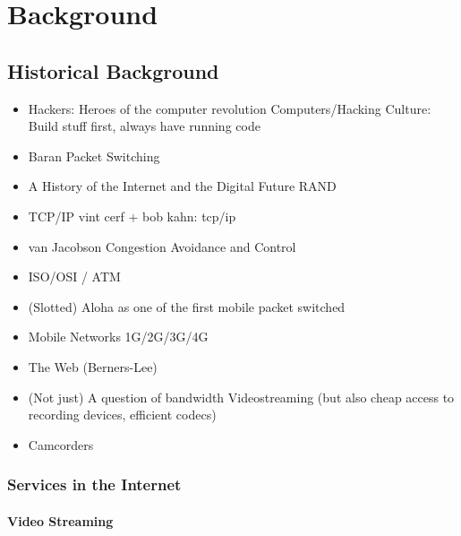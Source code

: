 \chapter{Background}
\label{chap:relatedwork}


\section{Historical Background}

\begin{itemize}
\item Hackers: Heroes of the computer revolution \cite{levy2010hackers}
		Computers/Hacking Culture: Build stuff first, always have running code
\item Baran Packet Switching
\item A History of the Internet and the Digital Future \cite{ryan2010history}
		RAND
\item TCP/IP vint cerf + bob kahn: tcp/ip \cite{1092259}
\item van Jacobson Congestion Avoidance and Control \cite{jacobson1988congestion}
\item ISO/OSI / ATM
\item (Slotted) Aloha as one of the first mobile packet switched
\item Mobile Networks 1G/2G/3G/4G
\item The Web (Berners-Lee)
\item (Not just) A question of bandwidth Videostreaming (but also cheap access to recording devices, efficient codecs)
\item Camcorders

\end{itemize}


\subsection{Services in the Internet}

\subsubsection{Video Streaming}

